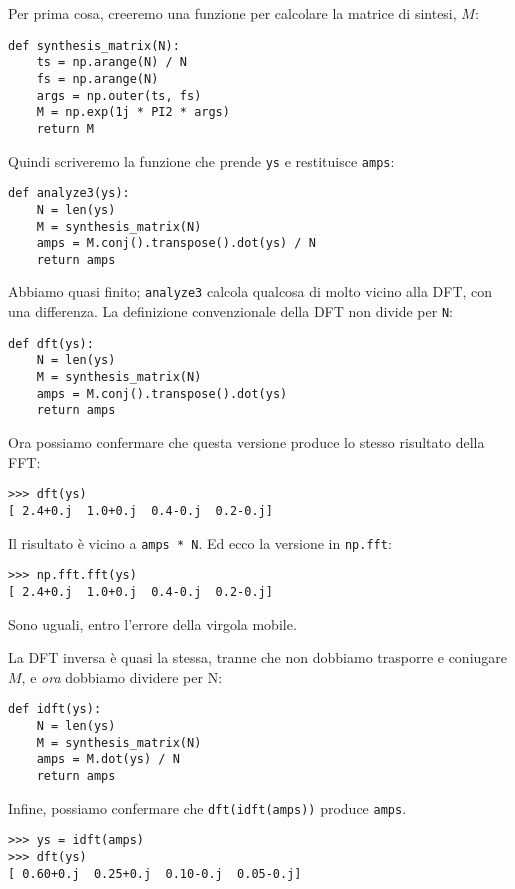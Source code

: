 \documentclass[12pt,a4paper]{book}
\begin{document}
Per prima cosa, creeremo una funzione per calcolare la matrice di sintesi, $M$:

\begin{verbatim} 
def synthesis_matrix(N):
    ts = np.arange(N) / N
    fs = np.arange(N)
    args = np.outer(ts, fs)
    M = np.exp(1j * PI2 * args)
    return M
 \end{verbatim} 

Quindi scriveremo la funzione che prende {\tt ys} e restituisce {\tt amps}:

\begin{verbatim} 
def analyze3(ys):
    N = len(ys)
    M = synthesis_matrix(N)
    amps = M.conj().transpose().dot(ys) / N
    return amps
 \end{verbatim} 

Abbiamo quasi finito; {\tt analyze3} calcola qualcosa di molto vicino alla DFT, con una differenza. La definizione convenzionale della DFT non divide per {\tt N}:

\begin{verbatim} 
def dft(ys):
    N = len(ys)
    M = synthesis_matrix(N)
    amps = M.conj().transpose().dot(ys)
    return amps
 \end{verbatim} 

Ora possiamo confermare che questa versione produce lo stesso risultato della FFT:

\begin{verbatim} 
>>> dft(ys)
[ 2.4+0.j  1.0+0.j  0.4-0.j  0.2-0.j]
 \end{verbatim} 

Il risultato è vicino a {\tt amps * N}. Ed ecco la versione in {\tt np.fft}:

\begin{verbatim} 
>>> np.fft.fft(ys)
[ 2.4+0.j  1.0+0.j  0.4-0.j  0.2-0.j]
 \end{verbatim} 

Sono uguali, entro l'errore della virgola mobile.

La DFT inversa è quasi la stessa, tranne che non dobbiamo trasporre e coniugare $M$, e {\em ora} dobbiamo dividere per N:

\begin{verbatim} 
def idft(ys):
    N = len(ys)
    M = synthesis_matrix(N)
    amps = M.dot(ys) / N
    return amps
 \end{verbatim} 

Infine, possiamo confermare che {\tt dft(idft(amps))} produce {\tt amps}.

\begin{verbatim} 
>>> ys = idft(amps)
>>> dft(ys)
[ 0.60+0.j  0.25+0.j  0.10-0.j  0.05-0.j]
 \end{verbatim} 
\end{document}
